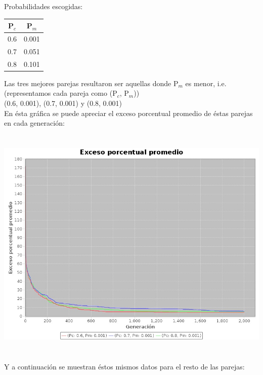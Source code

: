\documentclass[12pt]{article}
\begin{document}
\noindent Probabilidades escogidas: \\

\begin{center}
    \begin{tabular}{c | c}
      P$_c$ & P$_m$  \\ \hline
      0.6 & 0.001  \\ \hline
      0.7 & 0.051  \\ \hline
      0.8 & 0.101  \\
    \end{tabular}
\end{center}

\noindent Las tres mejores parejas resultaron ser aquellas donde P$_m$ es menor, i.e.
(representamos cada pareja como (P$_c$, P$_m$)) \\
(0.6, 0.001), (0.7, 0.001) y (0.8, 0.001) \\

\noindent En ésta gráfica se puede apreciar el exceso porcentual promedio de éstas  parejas
en cada generación: \\ \\ \\

\includegraphics[width=\textwidth]{datos.jpeg} \\ \\ \\

\noindent Y a continuación se muestran éstos mismos datos para el resto de las parejas: \\
\end{document}
